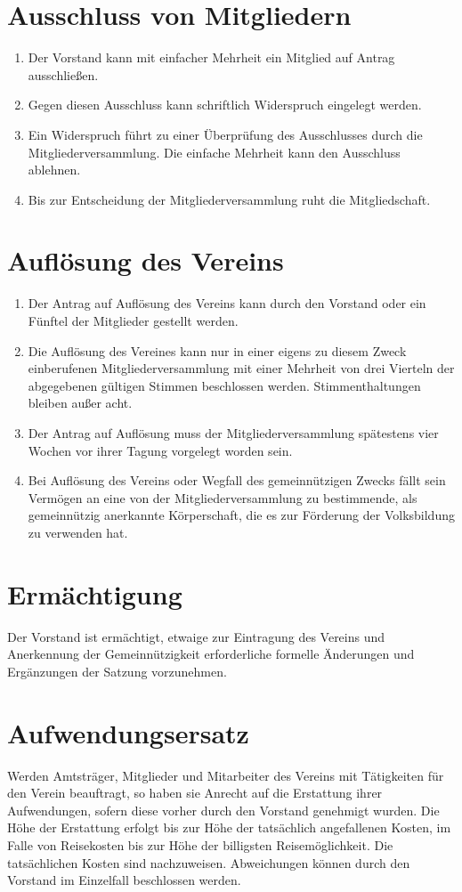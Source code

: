 \documentclass[a4paper, 12pt]{scrartcl}
\begin{document}
\section{Ausschluss von Mitgliedern}
\begin{enumerate}
	\item Der Vorstand kann mit einfacher Mehrheit ein Mitglied auf Antrag ausschließen.
	\item Gegen diesen Ausschluss kann schriftlich Widerspruch eingelegt werden.
	\item Ein Widerspruch führt zu einer Überprüfung des Ausschlusses durch die Mitgliederversammlung. Die einfache Mehrheit kann den Ausschluss ablehnen.
	\item Bis zur Entscheidung der Mitgliederversammlung ruht die Mitgliedschaft.
\end{enumerate}

\section{Auflösung des Vereins}
\begin{enumerate}
	\item Der Antrag auf Auflösung des Vereins kann durch den Vorstand oder ein Fünftel der Mitglieder gestellt werden.
	\item Die Auflösung des Vereines kann nur in einer eigens zu diesem Zweck einberufenen Mitgliederversammlung mit einer Mehrheit von drei Vierteln der abgegebenen gültigen Stimmen beschlossen werden. Stimmenthaltungen bleiben außer acht.
	\item Der Antrag auf Auflösung muss der Mitgliederversammlung spätestens vier
Wochen vor ihrer Tagung vorgelegt worden sein.
	\item Bei Auflösung des Vereins oder Wegfall des gemeinnützigen Zwecks fällt sein Vermögen an eine von der Mitgliederversammlung zu bestimmende,
als gemeinnützig anerkannte Körperschaft, die es zur Förderung der Volksbildung zu verwenden hat.
\end{enumerate}

\section{Ermächtigung}
\label{ermaechtigung}
Der Vorstand ist ermächtigt, etwaige zur Eintragung des Vereins und Anerkennung der Gemeinnützigkeit erforderliche formelle Änderungen und Ergänzungen der Satzung vorzunehmen.

\section{Aufwendungsersatz}
Werden Amtsträger, Mitglieder und Mitarbeiter des Vereins mit
Tätigkeiten für den Verein beauftragt, so haben sie Anrecht auf die
Erstattung ihrer Aufwendungen, sofern diese vorher durch den Vorstand genehmigt 
wurden. Die Höhe der Erstattung erfolgt bis zur
Höhe der tatsächlich angefallenen Kosten, im Falle von Reisekosten bis
zur Höhe der billigsten Reisemöglichkeit. Die tatsächlichen
Kosten sind nachzuweisen. Abweichungen können durch den
Vorstand im Einzelfall beschlossen werden. \\[1.5cm]
\end{document}
